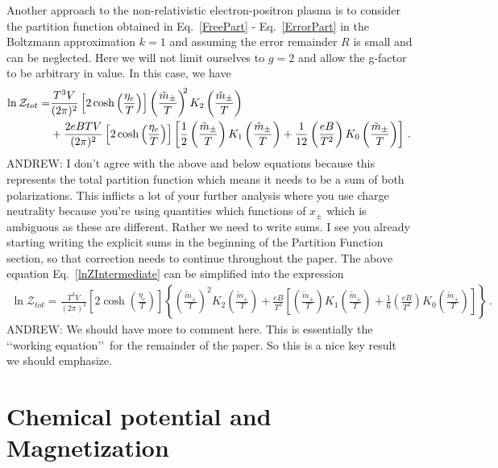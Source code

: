\documentclass[Universe,article,submit,moreauthors,pdftex]{Definitions/mdpi}
\newcommand*{\req}[1]{Eq.~{\eqref{#1}}}
\newcommand*{\xred}{\color{red}}
\begin{document}
Another approach to the non-relativistic electron-positron plasma is to consider the partition function obtained in \req{FreePart} - \req{ErrorPart} in the Boltzmann approximation $k=1$ and assuming the error remainder $R$ is small and can be neglected. Here we will not limit ourselves to $g=2$ and allow the g-factor to be arbitrary in value. In this case, we have
\begin{align}
  \label{lnZIntermediate}\ln\mathcal{Z}_{tot}=&\frac{T^3V}{(2\pi)^2}\left[2\cosh\left(\frac{\eta_{e}}{T}\right)\right]\left(\frac{\tilde m_\pm}{T}\right)^{\!\!2} K_2\left(\frac{\tilde{m}_{\pm}}{T}\right)\notag\\
  &+\frac{2eBTV}{(2\pi)^2}\left[2\cosh\left(\frac{\eta_{e}}{T}\right)\right]\left[\frac{1}{2}\left(\frac{\tilde m_\pm}{T}\right)K_1\left(\frac{\tilde{m}_{\pm}}{T}\right)+\frac{1}{12}\left(\frac{eB}{T^2}\right)K_0\left(\frac{\tilde{m}_{\pm}}{T}\right)\right]\,.
\end{align}
{\xred ANDREW: I don't agree with the above and below equations because this represents the total partition function which means it needs to be a sum of both polarizations. This inflicts a lot of your further analysis where you use charge neutrality because you're using quantities which functions of $x_{\pm}$ which is ambiguous as these are different. Rather we need to write sums. I see you already starting writing the explicit sums in the beginning of the Partition Function section, so that correction needs to continue throughout the paper.} The above equation \req{lnZIntermediate} can be simplified into the expression
\begin{align}
  \label{lnZ}\ln\mathcal{Z}_{tot}=\frac{T^3V}{(2\pi)^2}\left[2\cosh\left(\frac{\eta_{e}}{T}\right)\right]\left\{\left(\frac{\tilde m_\pm}{T}\right)^{\!\!2} K_2\left(\frac{\tilde{m}_{\pm}}{T}\right)+\frac{eB}{T^2} \left[\left(\frac{\tilde m_\pm}{T}\right)K_1\left(\frac{\tilde{m}_{\pm}}{T}\right)+\frac{1}{6}\left(\frac{eB}{T^2}\right)K_0\left(\frac{\tilde{m}_{\pm}}{T}\right)\right]\right\}\,.
\end{align}
{\xred ANDREW: We should have more to comment here. This is essentially the \lq\lq working equation\rq\rq\ for the remainder of the paper. So this is a nice key result we should emphasize.}

\section{Chemical potential and Magnetization}
\end{document}
